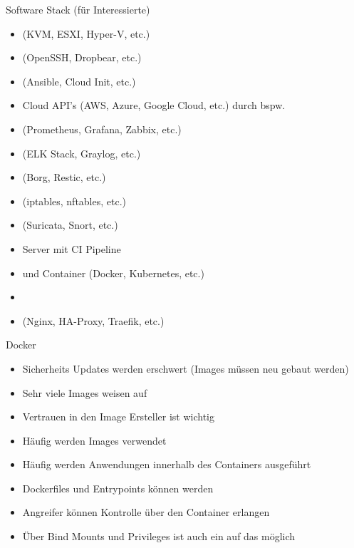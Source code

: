 \documentclass[12pt, aspectratio=169, usepdftitle=false]{beamer}
\newcommand{\nll}[1]{\note{\LARGE{#1}}}
\begin{document}
\begin{frame}[fragile]{Software Stack (für Interessierte)}
	\begin{itemize}
		\item \pause {} (KVM, ESXI, Hyper-V, etc.)
		\item \pause {} (OpenSSH, Dropbear, etc.)
		\item \pause {} (Ansible, Cloud Init, etc.)
		\item \pause Cloud API's (AWS, Azure, Google Cloud, etc.) durch bspw. 
		\item \pause {} (Prometheus, Grafana, Zabbix, etc.)
		\item \pause {} (ELK Stack, Graylog, etc.)
		\item \pause {} (Borg, Restic, etc.)
		\item \pause {} (iptables, nftables, etc.)
		\item \pause {} (Suricata, Snort, etc.)
		\item \pause {} Server mit CI Pipeline
		\item \pause {} und Container  (Docker, Kubernetes, etc.)
		\item \pause {}
		\item \pause {} (Nginx, HA-Proxy, Traefik, etc.)
	\end{itemize}
\end{frame}

\begin{frame}[fragile]{Docker}
	\begin{itemize}
		\item \pause Sicherheits Updates werden erschwert (Images müssen neu gebaut werden)
		\item \pause Sehr viele Images weisen  auf
		\item \pause Vertrauen in den Image Ersteller ist wichtig
		\item \pause Häufig werden  Images verwendet
		\item \pause Häufig werden Anwendungen innerhalb des Containers  ausgeführt \nll{Wieso ist das ein Problem?}
		\item \pause Dockerfiles und Entrypoints können  werden
		\item \pause Angreifer können Kontrolle über den Container erlangen
		\item \pause Über Bind Mounts und Privileges ist auch ein  auf das  möglich
	\end{itemize}
\end{frame}
\end{document}

